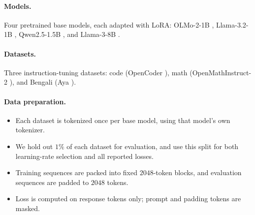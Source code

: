 \documentclass[11pt]{article}
\theoremstyle{plain}
\theoremstyle{definition}
\theoremstyle{remark}
\theoremstyle{definition}
\begin{document}
\paragraph{Models.} Four pretrained base models, each adapted with LoRA: OLMo-2-1B \cite{olmo2}, Llama-3.2-1B \cite{llama3}, Qwen2.5-1.5B \cite{qwen25}, and Llama-3-8B \cite{llama3}.

\paragraph{Datasets.} Three instruction-tuning datasets: code (OpenCoder \cite{opencoder}), math (OpenMathInstruct-2 \cite{openmathinstruct2}), and Bengali (Aya \cite{aya}).

\paragraph{Data preparation.}
\begin{itemize}[leftmargin=1.5em,itemsep=1pt,topsep=2pt]
  \item Each dataset is tokenized once per base model, using that model's own tokenizer.
  \item We hold out $1\%$ of each dataset for evaluation, and use this split for both learning-rate selection and all reported losses.
  \item Training sequences are packed into fixed $2048$-token blocks, and evaluation sequences are padded to $2048$ tokens.
  \item Loss is computed on response tokens only; prompt and padding tokens are masked.
\end{itemize}
\end{document}

